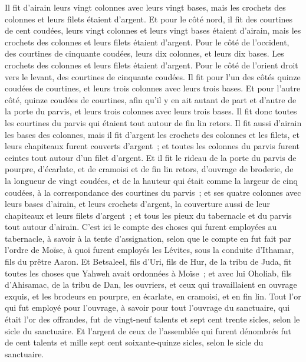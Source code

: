 \begin{multicols}{2}
Il fit d'airain leurs vingt colonnes avec leurs vingt bases, mais les crochets des colonnes et leurs filets étaient d'argent.
Et pour le côté nord, il fit des courtines de cent coudées, leurs vingt colonnes et leurs vingt bases étaient d'airain, mais les crochets des colonnes et leurs filets étaient d'argent.
Pour le côté de l'occident, des courtines de cinquante coudées, leurs dix colonnes, et leurs dix bases. Les crochets des colonnes et leurs filets étaient d'argent.
Pour le côté de l'orient droit vers le levant, des courtines de cinquante coudées.
Il fit pour l'un des côtés quinze coudées de courtines, et leurs trois colonnes avec leurs trois bases.
Et pour l'autre côté, quinze coudées de courtines, afin qu'il y en ait autant de part et d'autre de la porte du parvis, et leurs trois colonnes avec leurs trois bases.
Il fit donc toutes les courtines du parvis qui étaient tout autour de fin lin retors.
Il fit aussi d'airain les bases des colonnes, mais il fit d'argent les crochets des colonnes et les filets, et leurs chapiteaux furent couverts d'argent~; et toutes les colonnes du parvis furent ceintes tout autour d'un filet d'argent.
 Et il fit le rideau de la porte du parvis de pourpre, d'écarlate, et de cramoisi et de fin lin retors, d'ouvrage de broderie, de la longueur de vingt coudées, et de la hauteur qui était comme la largeur de cinq coudées, à la correspondance des courtines du parvis~;
et ses quatre colonnes avec leurs bases d'airain, et leurs crochets d'argent, la couverture aussi de leur chapiteaux et leurs filets d'argent~; 
 et tous les pieux du tabernacle et du parvis tout autour d'airain.
C'est ici le compte des choses qui furent employées au tabernacle, à savoir à la tente d'assignation, selon que le compte en fut fait par l'ordre de Moïse, à quoi furent employés les Lévites, sous la conduite d'Ithamar, fils du prêtre Aaron.
Et Betsaleel, fils d'Uri, fils de Hur, de la tribu de Juda, fit toutes les choses que Yahweh avait ordonnées à Moïse~;
et avec lui Oholiab, fils d'Ahisamac, de la tribu de Dan, les ouvriers, et ceux qui travaillaient en ouvrage exquis, et les brodeurs en pourpre, en écarlate, en cramoisi, et en fin lin.
Tout l'or qui fut employé pour l'ouvrage, à savoir pour tout l'ouvrage du sanctuaire, qui était l'or des offrandes, fut de vingt-neuf talents et sept cent trente sicles, selon le sicle du sanctuaire.
 Et l'argent de ceux de l'assemblée qui furent dénombrés fut de cent talents et mille sept cent soixante-quinze sicles, selon le sicle du sanctuaire.

\end{multicols}

